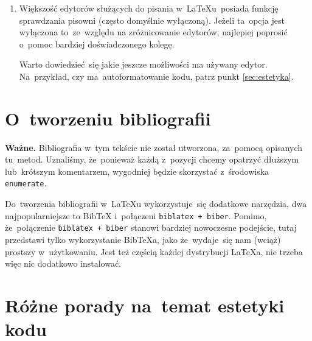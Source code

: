 \documentclass[a4paper,11pt]{article}
\newcommand{\tbs}{\textbackslash}  %
\begin{document}
\begin{enumerate}
  Jakikolwiek byłby dokładny sposób działania \texttt{\tbs
    newcommand}, sprawia~on, że~czasem \LaTeX{} protestuje jeśli
  w~definicji komendy nie umieści~się w~definicji dodatkowej pary
  nawiasów wąsatych wokół argumentów: \texttt{\#numer}. Dlatego
  w~przykładach w~tym tekście zawsze taką parę umieszczamy.
\item Większość edytorów służących do pisania w~\LaTeX u~posiada
  funkcję sprawdzania pisowni (często domyślnie wyłączoną). Jeżeli
  ta~opcja jest wyłączona to~ze~względu na zróżnicowanie edytorów,
  najlepiej poprosić o~pomoc bardziej doświadczonego kolegę.

  Warto dowiedzieć~się jakie jeszcze możliwości ma używany edytor.
  Na~przykład, czy ma~autoformatowanie kodu, patrz punkt
  \eqref{sec:estetyka}.

\end{enumerate}





\section{O~tworzeniu bibliografii}
\label{sec:bibliografia}

\begin{displayquote}
  \textbf{Ważne.} Bibliografia w~tym tekście nie został utworzona,
  za~pomocą opisanych tu~metod. Uznaliśmy, że~ponieważ każdą z~pozycji
  chcemy opatrzyć dłuższym lub~krótszym komentarzem, wygodniej będzie
  skorzystać z~środowiska \texttt{enumerate}.
\end{displayquote}

Do~tworzenia bibliografii w~\LaTeX u wykorzystuje~się dodatkowe
narzędzia, dwa najpopularniejsze to Bib\TeX{} i~połączeni
\texttt{biblatex + biber}. Pomimo, że~połączenie \texttt{biblatex +
  biber} stanowi bardziej nowoczesne podejście, tutaj przedstawi tylko
wykorzystanie Bib\TeX a, jako że~wydaje~się nam (wciąż) prostszy
w~użytkowaniu. Jest też częścią każdej dystrybucji \LaTeX a, nie
trzeba więc nic dodatkowo instalować.





\section{Różne porady na~temat estetyki kodu}
\label{sec:estetyka}
\end{document}
